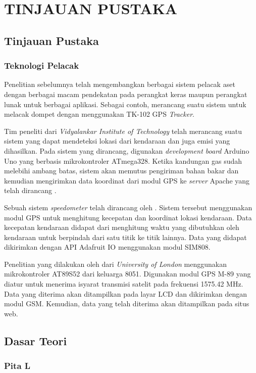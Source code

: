 \chapter{TINJAUAN PUSTAKA}

\section{Tinjauan Pustaka}
\subsection{Teknologi Pelacak}
Penelitian sebelumnya telah mengembangkan berbagai sistem pelacak aset dengan berbagai macam pendekatan pada perangkat keras maupun perangkat lunak untuk berbagai aplikasi. Sebagai contoh, \cite{Ekhsan2022} merancang suatu sistem untuk melacak dompet dengan menggunakan TK-102 GPS \textit{Tracker}.

Tim peneliti dari \textit{Vidyalankar Institute of Technology} telah merancang suatu sistem yang dapat mendeteksi lokasi dari kendaraan dan juga emisi  yang dihasilkan. Pada sistem yang dirancang, digunakan \textit{development board} Arduino Uno yang berbasis mikrokontroler ATmega328. Ketika kandungan gas  sudah melebihi ambang batas, sistem akan memutus pengiriman bahan bakar dan kemudian mengirimkan data koordinat dari modul GPS ke \textit{server} Apache yang telah dirancang \cite{Asha2022}.

Sebuah sistem \textit{speedometer} telah dirancang oleh \cite{Najmurrokhman2021}. Sistem tersebut menggunakan modul GPS untuk menghitung kecepatan dan koordinat lokasi kendaraan. Data kecepatan kendaraan didapat dari menghitung waktu yang dibutuhkan oleh kendaraan untuk berpindah dari satu titik ke titik lainnya. Data yang didapat dikirimkan dengan API Adafruit IO menggunakan modul SIM808.

Penelitian yang dilakukan oleh \cite{Mukhtar2015} dari \textit{University of London} menggunakan mikrokontroler AT89S52 dari keluarga 8051. Digunakan modul GPS M-89 yang diatur untuk menerima isyarat transmisi satelit pada frekuensi 1575.42 MHz. Data yang diterima akan ditampilkan pada layar LCD dan dikirimkan dengan modul GSM. Kemudian, data yang telah diterima akan ditampilkan pada situs web.

\section{Dasar Teori}
\subsection{Pita L}


